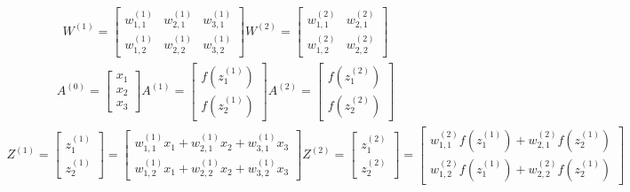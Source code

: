 \begin{align*}
    W^{(1)} = \begin{bmatrix} 
                w_{1,1}^{(1)} & w_{2,1}^{(1)} & w_{3,1}^{(1)} \\
                w_{1,2}^{(1)} & w_{2,2}^{(1)} & w_{3,2}^{(1)} 
              \end{bmatrix}
    W^{(2)} = \begin{bmatrix} 
                w_{1,1}^{(2)} & w_{2,1}^{(2)} \\
                w_{1,2}^{(2)} & w_{2,2}^{(2)}
              \end{bmatrix}
\end{align*}
\begin{align*}
    A^{(0)} = \begin{bmatrix} 
                x_1 \\
                x_2 \\
                x_3
              \end{bmatrix}
    A^{(1)} = \begin{bmatrix} 
                f(z_1^{(1)}) \\
                f(z_2^{(1)})
              \end{bmatrix}
    A^{(2)} = \begin{bmatrix} 
                f(z_1^{(2)}) \\
                f(z_2^{(2)})
              \end{bmatrix}          
\end{align*}
\begin{align*}
    Z^{(1)} = \begin{bmatrix} 
                z_1^{(1)} \\
                z_2^{(1)}
              \end{bmatrix}
            = \begin{bmatrix} 
                w_{1,1}^{(1)} x_1 + w_{2,1}^{(1)} x_2 + w_{3,1}^{(1)} x_3 \\
                w_{1,2}^{(1)} x_1 + w_{2,2}^{(1)} x_2 + w_{3,2}^{(1)} x_3 
              \end{bmatrix}
    Z^{(2)} = \begin{bmatrix} 
                z_1^{(2)} \\
                z_2^{(2)}
              \end{bmatrix}
            = \begin{bmatrix} 
                w_{1,1}^{(2)} f(z_1^{(1)}) + w_{2,1}^{(2)} f(z_2^{(1)}) \\
                w_{1,2}^{(2)} f(z_1^{(1)}) + w_{2,2}^{(2)} f(z_2^{(1)})
              \end{bmatrix} 
\end{align*}

